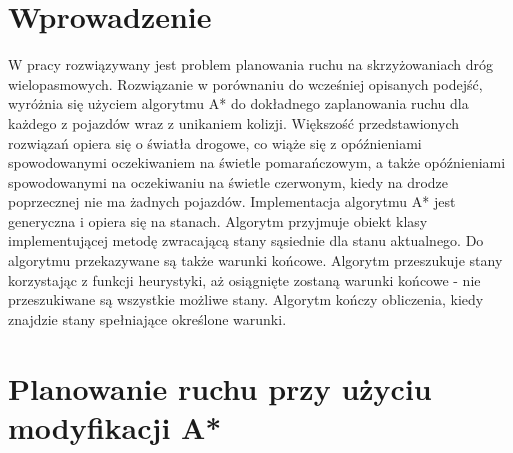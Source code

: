  \label{chap:thesis}


\section{Wprowadzenie}

W pracy rozwiązywany jest problem planowania ruchu na skrzyżowaniach dróg wielopasmowych. Rozwiązanie w porównaniu do wcześniej opisanych podejść, wyróżnia się użyciem algorytmu A* do dokładnego zaplanowania ruchu dla każdego z pojazdów wraz z unikaniem kolizji. Większość przedstawionych rozwiązań opiera się o światła drogowe, co wiąże się z opóźnieniami spowodowanymi oczekiwaniem na świetle pomarańczowym, a także opóźnieniami spowodowanymi na oczekiwaniu na świetle czerwonym, kiedy na drodze poprzecznej nie ma żadnych pojazdów. Implementacja algorytmu A* jest generyczna i opiera się na stanach. Algorytm przyjmuje obiekt klasy implementującej metodę zwracającą stany sąsiednie dla stanu aktualnego. Do algorytmu przekazywane są także warunki końcowe. Algorytm przeszukuje stany korzystając z funkcji heurystyki, aż osiągnięte zostaną warunki końcowe - nie przeszukiwane są wszystkie możliwe stany. Algorytm kończy obliczenia, kiedy znajdzie stany spełniające określone warunki.

\section{Planowanie ruchu przy użyciu modyfikacji A*}

